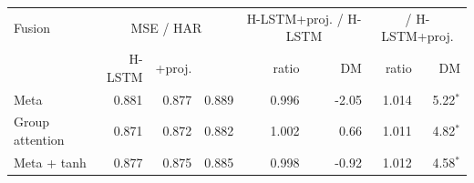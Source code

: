 \begin{tabular}{lrrrrrrr}
\toprule
Fusion & \multicolumn{3}{c}{MSE / HAR} & \multicolumn{2}{c}{H-LSTM+proj. / H-LSTM} & \multicolumn{2}{c}{\HQ{} / H-LSTM+proj.} \\
 & H-LSTM & +proj. & \HQ{} & ratio & DM & ratio & DM \\
\midrule
Meta & 0.881 & 0.877 & 0.889 & 0.996 & -2.05 & 1.014 & 5.22$^{*}$ \\
Group attention & 0.871 & 0.872 & 0.882 & 1.002 & 0.66 & 1.011 & 4.82$^{*}$ \\
Meta + tanh & 0.877 & 0.875 & 0.885 & 0.998 & -0.92 & 1.012 & 4.58$^{*}$ \\
\bottomrule
\end{tabular}
